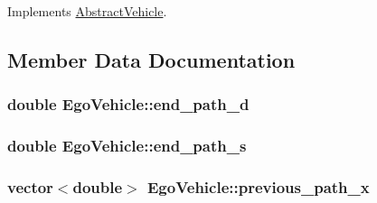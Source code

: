 Implements \hyperlink{classAbstractVehicle_a004b43b4a4d02ca6122ed8862c672de3}{Abstract\+Vehicle}.



\subsection{Member Data Documentation}
\subsubsection[{\texorpdfstring{end\+\_\+path\+\_\+d}{end_path_d}}]{\setlength{\rightskip}{0pt plus 5cm}double Ego\+Vehicle\+::end\+\_\+path\+\_\+d\hspace{0.3cm}{\ttfamily [protected]}}\hypertarget{classEgoVehicle_ab12c04925764e5963d51d5b15b491f4e}{}\label{classEgoVehicle_ab12c04925764e5963d51d5b15b491f4e}
\subsubsection[{\texorpdfstring{end\+\_\+path\+\_\+s}{end_path_s}}]{\setlength{\rightskip}{0pt plus 5cm}double Ego\+Vehicle\+::end\+\_\+path\+\_\+s\hspace{0.3cm}{\ttfamily [protected]}}\hypertarget{classEgoVehicle_ae60f078c638261d10fac67b96681cd4a}{}\label{classEgoVehicle_ae60f078c638261d10fac67b96681cd4a}
\subsubsection[{\texorpdfstring{previous\+\_\+path\+\_\+x}{previous_path_x}}]{\setlength{\rightskip}{0pt plus 5cm}vector$<$double$>$ Ego\+Vehicle\+::previous\+\_\+path\+\_\+x\hspace{0.3cm}{\ttfamily [protected]}}\hypertarget{classEgoVehicle_ae32d68e714c98e6e81f15bc9959ffb9e}{}\label{classEgoVehicle_ae32d68e714c98e6e81f15bc9959ffb9e}
